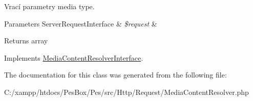 Vrací parametry media type.


\begin{DoxyParams}[1]{Parameters}
Server\+Request\+Interface & {\em \$request} & \\
\hline
\end{DoxyParams}
\begin{DoxyReturn}{Returns}
array 
\end{DoxyReturn}


Implements \mbox{\hyperlink{interface_pes_1_1_http_1_1_request_1_1_media_content_resolver_interface_af1d02209d81e589acebb7d0afecbe6da}{Media\+Content\+Resolver\+Interface}}.



The documentation for this class was generated from the following file\+:\begin{DoxyCompactItemize}
\item 
C\+:/xampp/htdocs/\+Pes\+Box/\+Pes/src/\+Http/\+Request/Media\+Content\+Resolver.\+php\end{DoxyCompactItemize}
